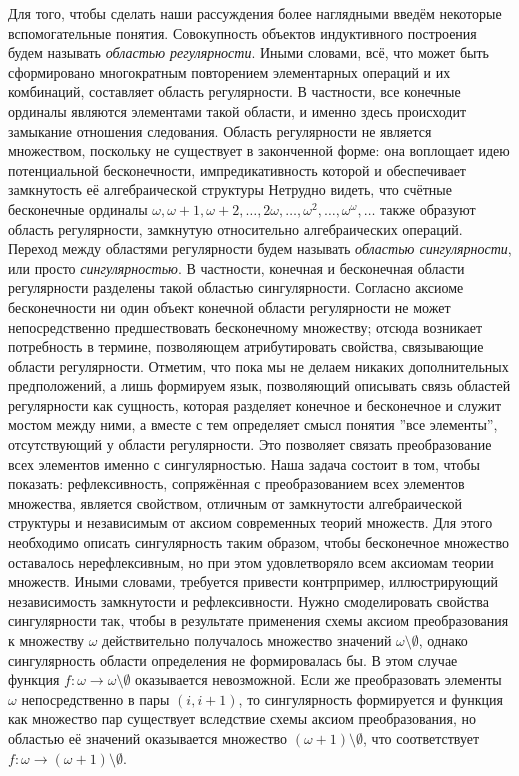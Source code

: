 \documentclass[12pt]{article}
\begin{document}
Для того, чтобы сделать наши рассуждения более наглядными введём некоторые вспомогательные понятия. Совокупность объектов индуктивного построения будем называть {\it областью регулярности}. Иными словами, всё, что может быть сформировано многократным повторением элементарных операций и их комбинаций, составляет область регулярности. В частности, все конечные ординалы являются элементами такой области, и именно здесь происходит замыкание отношения следования. Область регулярности не является множеством, поскольку не существует в законченной форме: она воплощает идею потенциальной бесконечности, импредикативность которой и обеспечивает замкнутость её алгебраической структуры Нетрудно видеть, что счётные бесконечные ординалы $\omega, \omega + 1, \omega + 2, \dots, 2\omega, \dots, \omega^2, \dots, \omega^\omega, \dots$ также образуют область регулярности, замкнутую относительно алгебраических операций. Переход между областями регулярности будем называть  {\it областью сингулярности}, или просто {\it сингулярностью}. В частности, конечная и бесконечная области регулярности разделены такой областью сингулярности. Согласно аксиоме бесконечности ни один объект конечной области регулярности не может непосредственно предшествовать бесконечному множеству; отсюда возникает потребность в термине, позволяющем атрибутировать свойства, связывающие области регулярности. Отметим, что пока мы не делаем никаких дополнительных предположений, а лишь формируем язык, позволяющий описывать связь областей регулярности как сущность, которая разделяет конечное и бесконечное и служит мостом между ними, а вместе с тем определяет смысл понятия ''все элементы'', отсутствующий у области регулярности. Это позволяет связать преобразование всех элементов именно с сингулярностью. Наша задача состоит в том, чтобы показать: рефлексивность, сопряжённая с преобразованием всех элементов множества, является свойством, отличным от замкнутости алгебраической структуры и независимым от аксиом современных теорий множеств. Для этого необходимо описать сингулярность таким образом, чтобы бесконечное множество оставалось нерефлексивным, но при этом удовлетворяло всем аксиомам теории множеств. Иными словами, требуется привести контрпример, иллюстрирующий независимость замкнутости и рефлексивности. Нужно смоделировать свойства сингулярности так, чтобы в результате применения схемы аксиом преобразования к множеству $\omega$ действительно получалось множество значений $\omega \setminus \emptyset$, однако сингулярность области определения не формировалась бы. В этом случае функция $f : \omega \to \omega \setminus \emptyset$ оказывается невозможной. Если же преобразовать элементы $\omega$ непосредственно в пары $(i, i+1)$, то сингулярность формируется и функция как множество пар существует вследствие схемы аксиом преобразования, но областью её значений оказывается множество $(\omega + 1) \setminus \emptyset$, что соответствует $f : \omega \to (\omega + 1) \setminus \emptyset$. 
\end{document}
